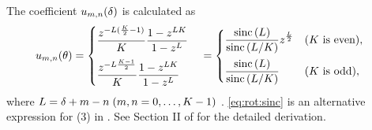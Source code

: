 \documentclass[sip,biber]{now-journal}
\begin{document}
The coefficient $u _{m,n}(\delta)$ is calculated as
\begin{align}
  u _{m,n}(\theta)
  &=
    \begin{cases}
      \displaystyle\frac{z ^{- L (\frac{K}{2} - 1) }}{K} \frac{1 - z ^{L K}}{1 - z ^{L}}\\[1em]
      \displaystyle\frac{z ^{- L \frac{K - 1}{2}}}{K} \frac{1 - z ^{L K}}{1 - z ^{L}}
    \end{cases}
  =
    \begin{cases}
      \displaystyle \frac{\operatorname{sinc}{(L)}}{\operatorname{sinc}{\left(L / K\right)}} z ^{\frac{L}{2}} & (\text{$K$ is even}),\\[1em]
      \displaystyle \frac{\operatorname{sinc}{(L)}}{\operatorname{sinc}{\left(L / K\right)}} & (\text{$K$ is odd}),
    \end{cases}\label{eq:rot:sinc}
\end{align}
where $L =\delta + m - n\; (m, n = 0, \dots, K - 1)$ \cite{Wakabayashi:2023:ASLP}.
\eqref{eq:rot:sinc} is an alternative expression for (3) in \cite{Wakabayashi:2023:ASLP}.
See Section II of \cite{Wakabayashi:2023:ASLP} for the detailed derivation.
\end{document}
